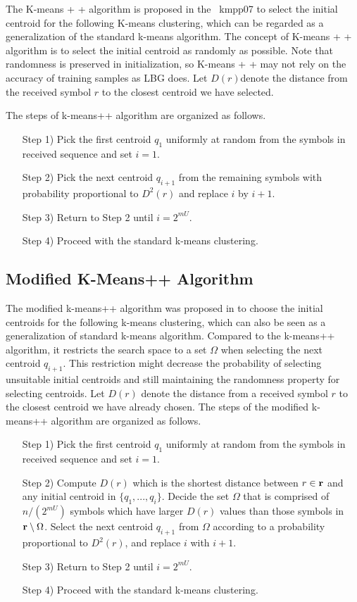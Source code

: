 The K-means + + algorithm is proposed in the \ {kmpp07} to select the initial centroid for the following K-means clustering, which can be regarded as a generalization of the standard k-means algorithm. The concept of K-means + + algorithm is to select the initial centroid as randomly as possible. Note that randomness is preserved in initialization, so K-means + + may not rely on the accuracy of training samples as LBG does. Let $D(r)$denote the distance from the received symbol $r$ to the closest centroid we have selected.

The steps of k-means++ algorithm are organized as follows.
\begin{enumerate}[leftmargin=\leftmargin+\widthof{Prefix}]
\item[Step 1)] Pick the first centroid $q_1$ uniformly at random from the symbols in received sequence and set $i=1$.
\item[Step 2)] Pick the next centroid $q_{i+1}$ from the remaining symbols with probability proportional to $D^2(r)$ and replace $i$ by $i+1$.
\item[Step 3)] Return to Step 2 until $i=2^{mU}$.
\item[Step 4)] Proceed with the standard k-means clustering.
\end{enumerate}


\subsection{Modified K-Means++ Algorithm}

The modified k-means++ algorithm was proposed in \cite{hsu2020uplink} to choose the initial centroids for the following k-means clustering, which can also be seen as a generalization of standard k-means algorithm. Compared to the k-means++ algorithm, it restricts the search space to a set $\Omega$ when selecting the next centroid $q_{i+1}$. This restriction might decrease the probability of selecting unsuitable initial centroids and still maintaining the randomness property for selecting centroids. Let $D(r)$ denote the distance from a received symbol $r$ to the closest centroid we have already chosen. The steps of the modified k-means++ algorithm are organized as follows.
\begin{enumerate}[leftmargin=\leftmargin+\widthof{Prefix}]
\item[Step 1)] Pick the first centroid $q_1$ uniformly at random from the symbols in received sequence and set $i=1$.
\item[Step 2)] Compute $D(r)$ which is the shortest distance between $r \in {\bf r}$ and any initial centroid in $\{q_1, ..., q_i\}$. Decide the set $\Omega$ that is comprised of $n/(2^{mU})$ symbols which have larger $D(r)$ values than those symbols in ${\bf r}\setminus\Omega$.   Select the next centroid $q_{i+1}$ from $\Omega$ according to a probability proportional to $D^2(r)$, and replace $i$ with $i+1$.
\item[Step 3)] Return to Step 2 until $i=2^{mU}$.
\item[Step 4)] Proceed with the standard k-means clustering.
\end{enumerate}

